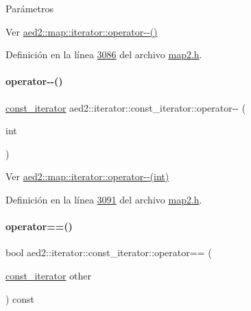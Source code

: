 \begin{DoxyParams}{\-Parámetros}
\begin{DoxyCompactItemize}
Ver \hyperlink{classaed2_1_1map_1_1iterator_ae7f70f71545d2a9de17b65edaaec748a_ae7f70f71545d2a9de17b65edaaec748a}{aed2\+::map\+::iterator\+::operator-\/-\/()} 



Definición en la línea \hyperlink{map2_8h_source_l03086}{3086} del archivo \hyperlink{map2_8h_source}{map2.\+h}.

\mbox{\label{classaed2_1_1iterator_1_1const__iterator_a7e421ccf4290b2945d538c9991df7c74_a7e421ccf4290b2945d538c9991df7c74}} 
\paragraph{\texorpdfstring{operator-\/-\/()}{operator--()}\hspace{0.1cm}{\footnotesize\ttfamily [2/2]}}
{\footnotesize\ttfamily \hyperlink{classaed2_1_1iterator_1_1const__iterator}{const\+\_\+iterator} aed2\+::iterator\+::const\+\_\+iterator\+::operator-\/-\/ (\begin{DoxyParamCaption}\item[{int}]{ }\end{DoxyParamCaption})\hspace{0.3cm}{\ttfamily [inline]}}



Ver \hyperlink{classaed2_1_1map_1_1iterator_add45e9ddbb8eeda99326cdb9ac9dd225_add45e9ddbb8eeda99326cdb9ac9dd225}{aed2\+::map\+::iterator\+::operator-\/-\/(int)} 



Definición en la línea \hyperlink{map2_8h_source_l03091}{3091} del archivo \hyperlink{map2_8h_source}{map2.\+h}.

\mbox{\label{classaed2_1_1iterator_1_1const__iterator_aa96bbb56e80fa97a9974ef97c826fe3a_aa96bbb56e80fa97a9974ef97c826fe3a}} 
\paragraph{\texorpdfstring{operator==()}{operator==()}}
{\footnotesize\ttfamily bool aed2\+::iterator\+::const\+\_\+iterator\+::operator== (\begin{DoxyParamCaption}\item[{\hyperlink{classaed2_1_1iterator_1_1const__iterator}{const\+\_\+iterator}}]{other }\end{DoxyParamCaption}) const\hspace{0.3cm}{\ttfamily [inline]}}




\end{DoxyCompactItemize}
\end{DoxyParams}
